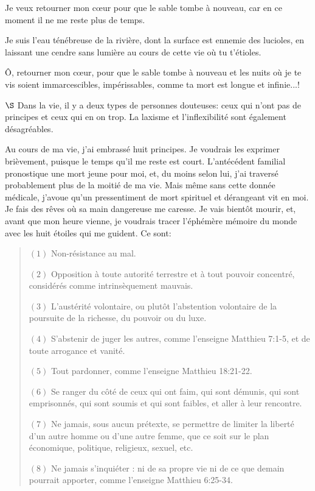 \documentclass[a4paper, 12pt]{article}
\begin{document}
Je veux retourner mon cœur pour que le sable tombe à nouveau, car en ce moment il
ne me reste plus de temps.

\pagebreak 

Je suis l'eau ténébreuse de la rivière,\newline
dont la surface est ennemie des lucioles,\newline
en laissant une cendre sans lumière\newline
au cours de cette vie où tu t'étioles.

Ô, retourner mon cœur, pour que le sable \newline
tombe à nouveau et les nuits où je te vis \newline
soient immarcescibles, impérissables, \newline
comme ta mort est longue et infinie...!

\pagebreak 

$\S$ Dans la vie, il y a deux types de personnes douteuses: ceux qui n'ont pas
de principes et ceux qui en on trop. La laxisme et l'inflexibilité sont
également désagréables.

Au cours de ma vie, j'ai embrassé huit principes. Je voudrais les exprimer
brièvement, puisque le temps qu'il me reste est court. L'antécédent familial
pronostique une mort jeune pour moi, et, du moins selon lui, j'ai traversé
probablement plus de la moitié de ma vie. Mais même sans cette donnée médicale,
j'avoue qu'un pressentiment de mort spirituel et dérangeant vit en moi. Je fais
des rêves où sa main dangereuse me caresse. Je vais bientôt mourir, et, avant
que mon heure vienne, je voudrais tracer l'éphémère mémoire du monde avec les
huit étoiles qui me guident. Ce sont:


\small
\begin{quote}

$(1)$ Non-résistance au mal.

$(2)$ Opposition à toute autorité terrestre et à tout pouvoir concentré,
considérés comme intrinsèquement mauvais.

$(3)$ L'austérité volontaire, ou plutôt l'abstention volontaire de la poursuite
de la richesse, du pouvoir ou du luxe.

$(4)$ S’abstenir de juger les autres, comme l’enseigne Matthieu 7:1-5, et de
toute arrogance et vanité.

$(5)$ Tout pardonner, comme l'enseigne Matthieu 18:21-22.

$(6)$ Se ranger du côté de ceux qui ont faim, qui sont démunis, qui sont
emprisonnés, qui sont soumis et qui sont faibles, et aller à leur rencontre.

$(7)$ Ne jamais, sous aucun prétexte, se permettre de limiter la liberté d'un
autre homme ou d'une autre femme, que ce soit sur le plan économique, politique,
religieux, sexuel, etc.

$(8)$ Ne jamais s'inquiéter : ni de sa propre vie ni de ce que demain pourrait
apporter, comme l'enseigne Matthieu 6:25-34.

\end{quote}
\normalsize
\end{document}
